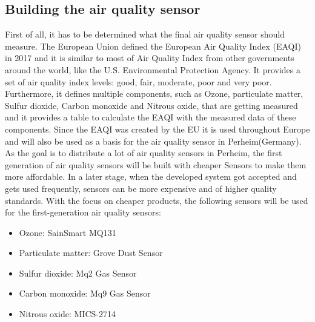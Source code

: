 \documentclass[conference]{IEEEtran}
\begin{document}
\subsection{Building the air quality sensor}
First of all, it has to be determined what the final air quality sensor should measure. The European Union defined the European Air Quality Index (EAQI) in 2017 and it is similar to most of Air Quality Index from other governments around the world, like the U.S. Environmental Protection Agency. It provides a set of air quality index levels: good, fair, moderate, poor and very poor. Furthermore, it defines multiple components, such as Ozone, particulate matter, Sulfur dioxide, Carbon monoxide and Nitrous oxide, that are getting measured and it provides a table to calculate the EAQI with the measured data of these components. Since the EAQI was created by the EU it is used throughout Europe and will also be used as a basis for the air quality sensor in Perheim(Germany). As the goal is to distribute a lot of air quality sensors in Perheim, the first generation of air quality sensors will be built with cheaper Sensors to make them more affordable. In a later stage, when the developed system got accepted and gets used frequently, sensors can be more expensive and of higher quality standards. With the focus on cheaper products, the following sensors will be used for the first-generation air quality sensors:
\begin{itemize}
\item Ozone: SainSmart MQ131
\item Particulate matter: Grove Dust Sensor
\item Sulfur dioxide: Mq2 Gas Sensor
\item Carbon monoxide: Mq9 Gas Sensor
\item Nitrous oxide: MICS-2714
\end{itemize}
\end{document}
